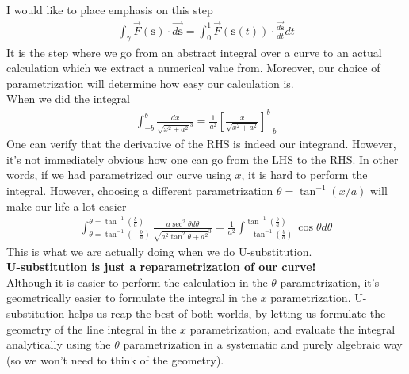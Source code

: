 \documentclass{article}
\begin{document}
I would like to place emphasis on this step
\begin{align}
    \int_\gamma \vec{F}(\mathbf{s}) \cdot \overrightarrow{d \mathbf{s}}=\int_0^1 \vec{F}(\mathbf{s}(t)) \cdot \frac{\overrightarrow{d \mathbf{s}}}{d t} d t \label{eq:param}
\end{align}
It is the step where we go from an abstract integral over a curve to an actual calculation which we extract a numerical value from. Moreover, our choice of parametrization will determine how easy our calculation is. \\[10pt]
When we did the integral 
\begin{align}
    \int_{-b}^b \frac{d x}{{\sqrt{x^2+a^2}}^3} = \frac{1}{a^2} \left[ \frac{x}{\sqrt{x^2+a^2}} \right]^b_{-b} 
\end{align}
One can verify that the derivative of the RHS is indeed our integrand. However, it's not immediately obvious how one can go from the LHS to the RHS. In other words, if we had parametrized our curve using $x$, it is hard to perform the integral. However, choosing a different parametrization $\theta = \tan^{-1}(x/a)$ will make our life a lot easier
\begin{align}
    \int_{\theta=\tan ^{-1}\left(-\frac{b}{a}\right)}^{\theta=\tan ^{-1}\left(\frac{b}{a}\right)} \frac{a \sec ^2 \theta d \theta}{{\sqrt{a^2 \tan ^2 \theta+a^2}}^3}=\frac{1}{a^2} \int_{-\tan ^{-1}\left(\frac{b}{a}\right)}^{\tan ^{-1}\left(\frac{b}{a}\right)} \cos \theta d \theta
\end{align}
This is what we are actually doing when we do U-substitution. \\[10pt] \textbf{U-substitution is just a reparametrization of our curve!}\\[10pt]
Although it is easier to perform the calculation in the $\theta$ parametrization, it's geometrically easier to formulate the integral in the $x$ parametrization. U-substitution helps us reap the best of both worlds, by letting us formulate the geometry of the line integral in the $x$ parametrization, and evaluate the integral analytically using the $\theta$ parametrization in a systematic and purely algebraic way (so we won't need to think of the geometry). 
\end{document}
